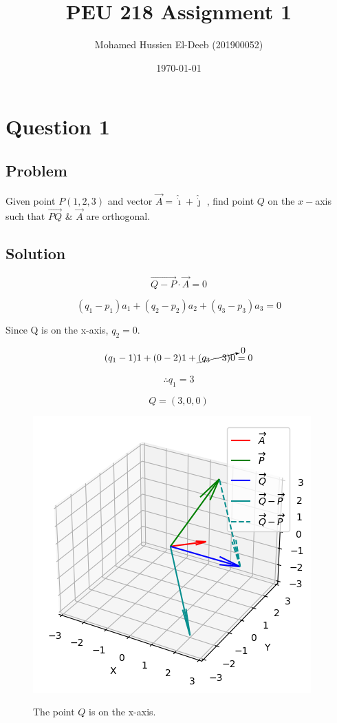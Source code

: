 \documentclass[12pt]{article}
\title{PEU 218 Assignment 1}
\author{Mohamed Hussien El-Deeb (201900052)}
\date{\today}
\begin{document}
\maketitle
\tableofcontents

\section{Question 1}

\subsection{Problem}

Given point \(P(1, 2, 3)\) and vector \(\vec{A}  = \hat{\dot{\imath}} + \hat{\dot{\jmath}}\)
, find point \(Q\) on the \(x-\)axis such that \(\overrightarrow{PQ} \)
\& \(\vec{A} \) are orthogonal.

\subsection{Solution}

\[\overrightarrow{Q-P} \cdot \vec{A} = 0\]

\[
    (q_1 - p_1)a_1 + (q_2 - p_2)a_2 + (q_3 - p_3)a_3 = 0
\]

Since Q is on the x-axis, \(q_2 = 0\).

\[
    (q_1 - 1)1 + (0 - 2)1 + \cancelto{0}{(q_3 - 3)0} = 0
\]

\[
    \therefore q_1 = 3
\]

\[
    Q = (3, 0, 0)
\]

\begin{figure}[H]
    \includegraphics[width=\linewidth]{Q1.png}\label{fig:Q1}
    \caption{The point \(Q\) is on the x-axis.\cite{El-Deeb_PEU-218_Assignments_py}}
\end{figure}
\end{document}
